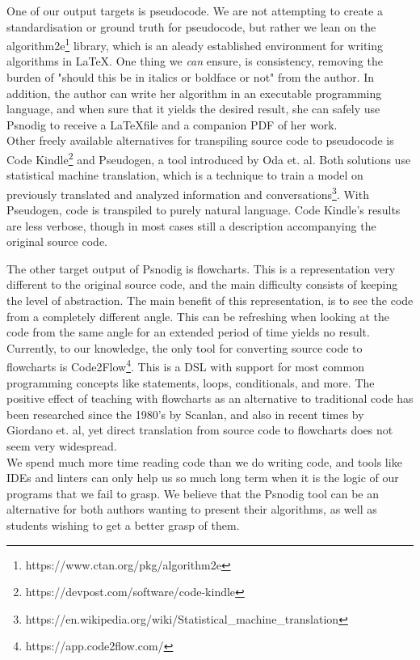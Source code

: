 One of our output targets is pseudocode. We are not attempting to create a standardisation or ground truth for pseudocode, but rather we lean on the algorithm2e\footnote{https://www.ctan.org/pkg/algorithm2e} library, which is an aleady established environment for writing algorithms in \LaTeX. One thing we \textit{can} ensure, is consistency, removing the burden of "should this be in italics or boldface or not" from the author. In addition, the author can write her algorithm in an executable programming language, and when sure that it yields the desired result, she can safely use Psnodig to receive a \LaTeX file and a companion PDF of her work. \hfill \\

Other freely available alternatives for transpiling source code to pseudocode is Code Kindle\footnote{https://devpost.com/software/code-kindle} and Pseudogen, a tool introduced by Oda et. al\cite{DBLP:conf/kbse/OdaFNHSTN15}. Both solutions use statistical machine translation, which is a technique to train a model on previously translated and analyzed information and conversations\footnote{https://en.wikipedia.org/wiki/Statistical\_machine\_translation}. With Pseudogen, code is transpiled to purely natural language. Code Kindle's results are less verbose, though in most cases still a description accompanying the original source code.

The other target output of Psnodig is flowcharts. This is a representation very different to the original source code, and the main difficulty consists of keeping the level of abstraction. The main benefit of this representation, is to see the code from a completely different angle. This can be refreshing when looking at the code from the same angle for an extended period of time yields no result. \hfill \\

Currently, to our knowledge, the only tool for converting source code to flowcharts is Code2Flow\footnote{https://app.code2flow.com/}. This is a DSL with support for most common programming concepts like statements, loops, conditionals, and more. The positive effect of teaching with flowcharts as an alternative to traditional code has been researched since the 1980's by Scanlan\cite{DBLP:journals/software/Scanlan89}, and also in recent times by Giordano et. al\cite{7096016}, yet direct translation from source code to flowcharts does not seem very widespread. \hfill \\

We spend much more time reading code than we do writing code\cite[14]{martin2008clean}, and tools like IDEs and linters can only help us so much long term when it is the logic of our programs that we fail to grasp. We believe that the Psnodig tool can be an alternative for both authors wanting to present their algorithms, as well as students wishing to get a better grasp of them. \hfill \\

